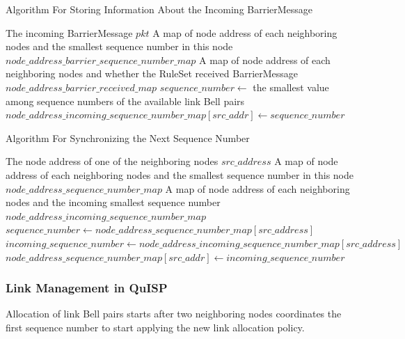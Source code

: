 \begin{algorithm}[H]  
  \caption{Algorithm For Storing Information About the Incoming BarrierMessage}                 
  \begin{algorithmic}[1]
    \Require The incoming BarrierMessage $pkt$
    \Require A map of node address of each neighboring nodes and the smallest sequence number in this node $node\_address\_barrier\_sequence\_number\_map$
    \Require A map of node address of each neighboring nodes and whether the RuleSet received BarrierMessage $node\_address\_barrier\_received\_map$
    \State $sequence\_number \gets$ the smallest value among sequence numbers of the available link Bell pairs
    \State $node\_address\_incoming\_sequence\_number\_map[src\_addr] \gets sequence\_number$
  \end{algorithmic}
\end{algorithm}

\begin{algorithm}[H]  
  \caption{Algorithm For Synchronizing the Next Sequence Number}                 
  \begin{algorithmic}[1]
    \Require The node address of one of the neighboring nodes $src\_address$
    \Require A map of node address of each neighboring nodes and the smallest sequence number in this node $node\_address\_sequence\_number\_map$
    \Require A map of node address of each neighboring nodes and the incoming smallest sequence number $node\_address\_incoming\_sequence\_number\_map$
    \State $sequence\_number \gets node\_address\_sequence\_number\_map[src\_address]$
    \State $incoming\_sequence\_number \gets node\_address\_incoming\_sequence\_number\_map[src\_address]$
      \State $node\_address\_sequence\_number\_map[src\_addr] \gets incoming\_sequence\_number$
    \EndIf
  \end{algorithmic}
\end{algorithm}

\subsubsection{Link Management in QuISP}

Allocation of link Bell pairs starts after two neighboring nodes coordinates the first sequence number to start applying the new link allocation policy.

